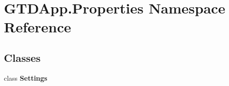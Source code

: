 \section{G\+T\+D\+App.\+Properties Namespace Reference}
\label{namespace_g_t_d_app_1_1_properties}
\subsection*{Classes}
\begin{DoxyCompactItemize}
\item 
class {\bfseries Settings}
\end{DoxyCompactItemize}
